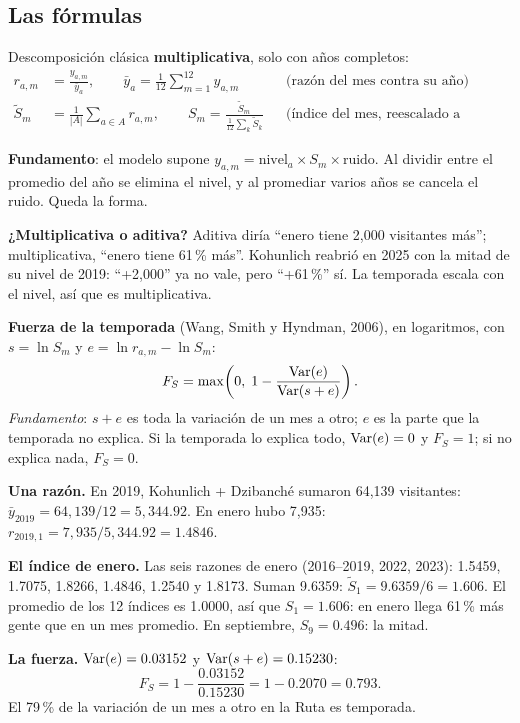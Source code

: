 \subsection{Las fórmulas}
Descomposición clásica \textbf{multiplicativa}, solo con años completos:
\begin{align*}
r_{a,m}&=\frac{y_{a,m}}{\bar y_a},\qquad \bar y_a=\tfrac{1}{12}\sum_{m=1}^{12}y_{a,m} &&\text{(razón del mes contra su año)}\\
\tilde S_m&=\frac{1}{|A|}\sum_{a\in A}r_{a,m},\qquad S_m=\frac{\tilde S_m}{\frac{1}{12}\sum_k\tilde S_k} &&\text{(índice del mes, reescalado a promedio 1)}
\end{align*}

\textbf{Fundamento}: el modelo supone $y_{a,m}=\text{nivel}_a\times S_m\times\text{ruido}$. Al dividir entre el promedio
del año se elimina el nivel, y al promediar varios años se cancela el ruido. Queda la forma.

\textbf{¿Multiplicativa o aditiva?} Aditiva diría ``enero tiene 2,000 visitantes más''; multiplicativa, ``enero tiene 61\,\%
más''. Kohunlich reabrió en 2025 con la mitad de su nivel de 2019: ``+2,000'' ya no vale, pero ``+61\,\%'' sí. La temporada
escala con el nivel, así que es multiplicativa.

\textbf{Fuerza de la temporada} (Wang, Smith y Hyndman, 2006), en logaritmos, con $s=\ln S_m$ y $e=\ln r_{a,m}-\ln S_m$:
\[
F_S=\max\!\left(0,\;1-\frac{\operatorname{Var}(e)}{\operatorname{Var}(s+e)}\right).
\]
\emph{Fundamento}: $s+e$ es toda la variación de un mes a otro; $e$ es la parte que la temporada no explica. Si la
temporada lo explica todo, $\operatorname{Var}(e)=0$ y $F_S=1$; si no explica nada, $F_S=0$.

\begin{amano}
\textbf{Una razón.} En 2019, Kohunlich + Dzibanché sumaron 64,139 visitantes: $\bar y_{2019}=64{,}139/12=5{,}344.92$. En
enero hubo 7,935: $r_{2019,1}=7{,}935/5{,}344.92=1.4846$.

\textbf{El índice de enero.} Las seis razones de enero (2016–2019, 2022, 2023): 1.5459, 1.7075, 1.8266, 1.4846, 1.2540 y
1.8173. Suman 9.6359: $\tilde S_1=9.6359/6=1.606$. El promedio de los 12 índices es 1.0000, así que $S_1=1.606$: en enero
llega 61\,\% más gente que en un mes promedio. En septiembre, $S_9=0.496$: la mitad.

\textbf{La fuerza.} $\operatorname{Var}(e)=0.03152$ y $\operatorname{Var}(s+e)=0.15230$:
\[F_S=1-\frac{0.03152}{0.15230}=1-0.2070=0.793 .\]
El 79\,\% de la variación de un mes a otro en la Ruta es temporada.
\end{amano}

